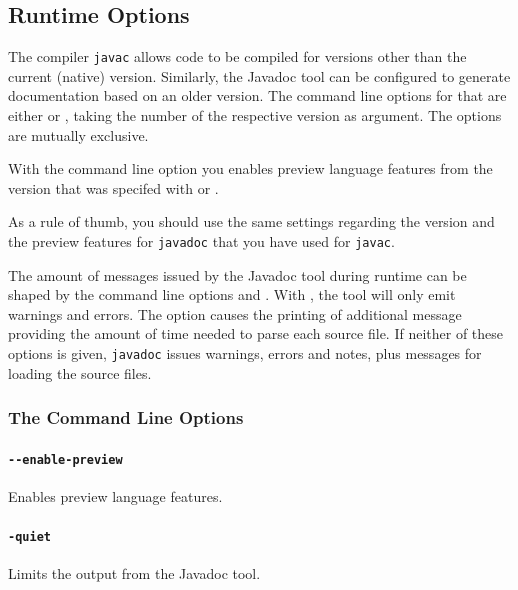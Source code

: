 \subsection{Runtime Options}\label{sec:RuntimeOptions}
The \Java compiler \texttt{javac} allows code to be compiled for versions other than the current (native) version. Similarly, the Javadoc tool can be configured to generate documentation based on an older \Java version. The command line options for that are either \mbox{} or \mbox{}, taking the number of the respective version as argument. The options are mutually exclusive. 

With the command line option \mbox{} you enables preview language features from the \Java version that was specifed with \mbox{} or \mbox{}.

As a rule of thumb, you should use the same settings regarding the \Java version and the preview features for \texttt{javadoc} that you have used for \texttt{javac}.

The amount of messages issued by the Javadoc tool during runtime can be shaped by the command line options \mbox{} and \mbox{}. With \mbox{}, the tool will only emit warnings and errors. The \mbox{} option causes the printing of additional message providing the amount of time needed to parse each source file. If neither of these options is given, \texttt{javadoc} issues warnings, errors and notes, plus messages for loading the source files.

\subsubsection{The Command Line Options}

\paragraph{\texttt{-{}-enable-preview}} Enables preview language features.

\paragraph{\texttt{-quiet}} Limits the output from the Javadoc tool.


